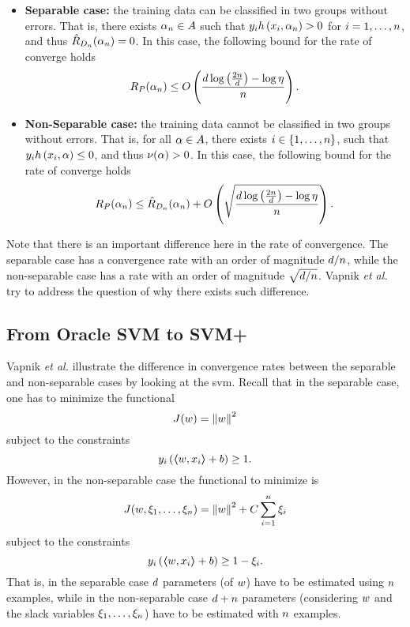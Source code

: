 \begin{itemize}
    \item \textbf{Separable case:} the training data can be classified in two groups without errors. That is, there exists $\alpha_n \in A$ such that $y_i h\left(x_i, \alpha_n\right) > 0$ for $i = 1, \ldots, n$, and thus $\hat{R}_{D_{n}}(\alpha_n) = 0$.
    In this case, the following bound for the rate of converge holds
    \begin{equation}
        \nonumber
        R_P(\alpha_n) \leq O\left( \frac{d \log\left(\frac{2n}{d} \right) - \log\eta}{n}  \right) .
    \end{equation}
    \item \textbf{Non-Separable case:} the training data cannot be classified in two groups without errors. That is, for all $\alpha \in A$, there exists $i \in \left\{1, \ldots, n\right\}$, such that $y_i h\left(x_i, \alpha\right) \leq 0$, and thus $\nu(\alpha) > 0$.
    In this case, the following bound for the rate of converge holds
    \begin{equation}
        \label{eq:nonsep_bound}
        \exprisk(\param_\nsamples) \leq \empriskn(\param_\nsamples) + \bigO{\sqrt{\frac{\vc \log\left(\frac{2\nsamples}{\vc} \right) - \log\eta}{\nsamples}} } .
    \end{equation}
\end{itemize}
Note that there is an important difference here in the rate of convergence. The separable case has a convergence rate with an order of magnitude $d/n$, while the non-separable case has a rate with an order of magnitude $\sqrt{d/n}$. Vapnik \emph{et al.} try to address the question of why there exists such difference.

\subsection{From Oracle SVM to SVM+}
Vapnik \emph{et al.} illustrate the difference in convergence rates between the separable and non-separable cases by looking at the \acrshort{svm}. Recall that in the separable case, one has to minimize the functional 
$$J(w) = \left\lVert w\right\rVert^2$$
subject to the constraints
$$y_i \left( \bm{\left\langle} w, x_i \bm{\right\rangle} + b \right) \geq 1.$$
However, in the non-separable case the functional to minimize is 
$$J(w, \xi_1, \ldots, \xi_n) = \left\lVert w\right\rVert^2 + C \sum_{i=1}^n \xi_i$$
subject to the constraints
$$y_i \left( \bm{\left\langle} w, x_i \bm{\right\rangle} + b \right) \geq 1 - \xi_i.$$
That is, in the separable case $d$ parameters (of $w$) have to be estimated using $n$ examples, while in the non-separable case $d + n$ parameters (considering $w$ and the slack variables $\xi_1, \ldots, \xi_n$) have to be estimated with $n$ examples. 

